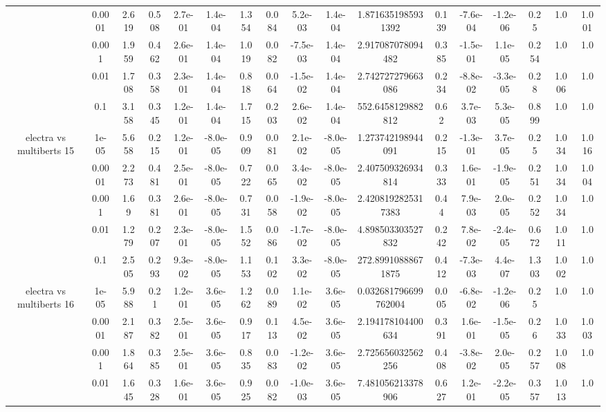 \begin{tabular}{|c|c|c|c|c|c|c|c|c|c|c|c|c|c|c|c|c|}
 & 0.0001 & 2.619 & 0.508 & 2.7e-01 & 1.4e-04 & 1.354 & 0.084 & 5.2e-03 & 1.4e-04 & 1.8716351985931392 & 0.139 & -7.6e-04 & -1.2e-06 & 0.25 & 1.0 & 1.001 \\
 & 0.001 & 1.959 & 0.462 & 2.6e-01 & 1.4e-04 & 1.019 & 0.082 & -7.5e-03 & 1.4e-04 & 2.917087078094482 & 0.385 & -1.5e-01 & 1.1e-05 & 0.254 & 1.0 & 1.0 \\
 & 0.01 & 1.708 & 0.358 & 2.3e-01 & 1.4e-04 & 0.818 & 0.064 & -1.5e-02 & 1.4e-04 & 2.742727279663086 & 0.234 & -8.8e-02 & -3.3e-05 & 0.28 & 1.006 & 1.0 \\
 & 0.1 & 3.158 & 0.345 & 1.2e-01 & 1.4e-04 & 1.715 & 0.203 & 2.6e-02 & 1.4e-04 & 552.6458129882812 & 0.62 & 3.7e-03 & 5.3e-05 & 0.899 & 1.0 & 1.0 \\
\hline
\multirow{5}{*}{electra  vs multiberts 15} & 1e-05 & 5.658 & 0.215 & 1.2e-01 & -8.0e-05 & 0.909 & 0.081 & 2.1e-02 & -8.0e-05 & 1.273742198944091 & 0.215 & -1.3e-01 & 3.7e-05 & 0.25 & 1.034 & 1.016 \\
 & 0.0001 & 2.273 & 0.481 & 2.5e-01 & -8.0e-05 & 0.722 & 0.065 & 3.4e-02 & -8.0e-05 & 2.407509326934814 & 0.333 & 1.6e-01 & -1.9e-05 & 0.251 & 1.034 & 1.004 \\
 & 0.001 & 1.69 & 0.381 & 2.6e-01 & -8.0e-05 & 0.731 & 0.058 & -1.9e-02 & -8.0e-05 & 2.4208192825317383 & 0.44 & 7.9e-03 & 2.0e-05 & 0.252 & 1.034 & 1.0 \\
 & 0.01 & 1.279 & 0.207 & 2.3e-01 & -8.0e-05 & 1.552 & 0.086 & -1.7e-02 & -8.0e-05 & 4.898503303527832 & 0.242 & 7.8e-02 & -2.4e-05 & 0.672 & 1.011 & 1.0 \\
 & 0.1 & 2.505 & 0.293 & 9.3e-02 & -8.0e-05 & 1.153 & 0.102 & 3.3e-02 & -8.0e-05 & 272.89910888671875 & 0.412 & -7.3e-03 & 4.4e-07 & 1.303 & 1.002 & 1.0 \\
\hline
\multirow{5}{*}{electra  vs multiberts 16} & 1e-05 & 5.988 & 0.21 & 1.2e-01 & 3.6e-05 & 1.262 & 0.089 & 1.1e-02 & 3.6e-05 & 0.032681796699762004 & 0.005 & -6.8e-02 & -1.2e-06 & 0.25 & 1.0 & 1.0 \\
 & 0.0001 & 2.187 & 0.382 & 2.5e-01 & 3.6e-05 & 0.917 & 0.113 & 4.5e-02 & 3.6e-05 & 2.194178104400634 & 0.391 & 1.6e-01 & -1.5e-05 & 0.26 & 1.033 & 1.003 \\
 & 0.001 & 1.864 & 0.385 & 2.5e-01 & 3.6e-05 & 0.835 & 0.083 & -1.2e-02 & 3.6e-05 & 2.725656032562256 & 0.408 & -3.8e-02 & 2.0e-05 & 0.257 & 1.008 & 1.0 \\
 & 0.01 & 1.645 & 0.328 & 1.6e-01 & 3.6e-05 & 0.925 & 0.082 & -1.0e-03 & 3.6e-05 & 7.481056213378906 & 0.627 & 1.2e-01 & -2.2e-05 & 0.357 & 1.013 & 1.0 \\

\end{tabular}
